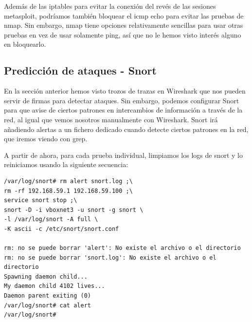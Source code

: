 \documentclass[a4paper,12pt]{scrartcl}
\begin{document}
Además de las iptables para evitar la conexión del revés de las sesiones metasploit, podríamos también bloquear el icmp echo para evitar las pruebas de nmap. Sin embargo, nmap tiene opciones relativamente sencillas para usar otras pruebas en vez de usar solamente ping, así que no le hemos visto interés alguno en bloquearlo.

\subsection{Predicción de ataques - Snort}






En la sección anterior hemos visto trozos de trazas en Wireshark que nos pueden servir de firmas para detectar ataques. Sin embargo, podemos configurar Snort para que avise de ciertos patrones en intercambios de información a través de la red, al igual que vemos nosotros manualmente con Wireshark. Snort irá añadiendo alertas a un fichero dedicado cuando detecte ciertos patrones en la red, que iremos viendo con grep.


A partir de ahora, para cada prueba individual, limpiamos los logs de snort y lo reiniciamos usando la siguiente secuencia:

\begin{verbatim}
/var/log/snort# rm alert snort.log ;\
rm -rf 192.168.59.1 192.168.59.100 ;\ 
service snort stop ;\ 
snort -D -i vboxnet3 -u snort -g snort \
-l /var/log/snort -A full \
-K ascii -c /etc/snort/snort.conf 

rm: no se puede borrar 'alert': No existe el archivo o el directorio
rm: no se puede borrar 'snort.log': No existe el archivo o el directorio
Spawning daemon child...
My daemon child 4102 lives...
Daemon parent exiting (0)
/var/log/snort# cat alert 
/var/log/snort#
\end{verbatim}
\end{document}

